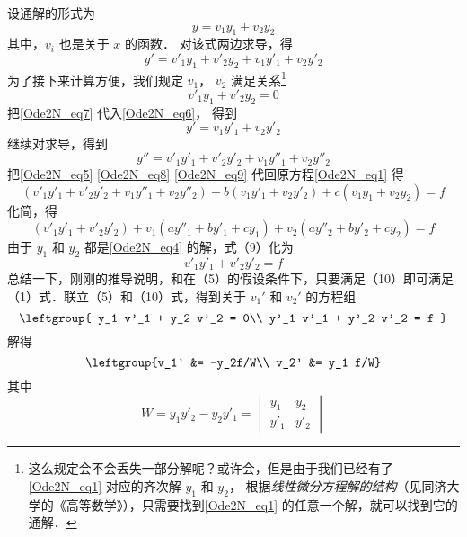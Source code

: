 设通解的形式为
\begin{equation}\label{Ode2N_eq5}
y = v_1 y_1 + v_2 y_2
\end{equation}
其中，$v_i$ 也是关于 $x$ 的函数． 对该式两边求导，得
\begin{equation}\label{Ode2N_eq6}
y' = v'_1 y_1 + v'_2 y_2 + v_1 y'_1 + v_2 y'_2
\end{equation}
为了接下来计算方便，我们规定 $v_1$， $v_2$ 满足关系\footnote{这么规定会不会丢失一部分解呢？或许会，但是由于我们已经有了\autoref{Ode2N_eq1} 对应的齐次解 $y_1$ 和 $y_2$， 根据\emph{线性微分方程解的结构}（见同济大学的《高等数学》），只需要找到\autoref{Ode2N_eq1} 的任意一个解，就可以找到它的通解．}
\begin{equation}\label{Ode2N_eq7}
v'_1 y_1 + v'_2 y_2 = 0
\end{equation}
把\autoref{Ode2N_eq7} 代入\autoref{Ode2N_eq6}， 得到
\begin{equation}\label{Ode2N_eq8}
y' = v_1 y'_1 + v_2 y'_2
\end{equation}
继续对求导，得到
\begin{equation}\label{Ode2N_eq9}
y'' = v'_1 y'_1 + v'_2 y'_2 + v_1 y''_1 + v_2 y''_2
\end{equation}
把\autoref{Ode2N_eq5} \autoref{Ode2N_eq8} \autoref{Ode2N_eq9} 代回原方程\autoref{Ode2N_eq1} 得
\begin{equation}
(v'_1 y'_1 + v'_2 y'_2 + v_1 y''_1 + v_2 y''_2) + b (v_1 y'_1 + v_2 y'_2) + c(v_1 y_1 + v_2 y_2) = f
\end{equation}
化简，得
\begin{equation}
(v'_1 y'_1 + v'_2 y'_2) + v_1 (a y''_1 + b y'_1 + c y_1) + v_2 (a y''_2 + b y'_2 + c y_2) = f \end{equation}
由于 $y_1$ 和 $y_2$ 都是\autoref{Ode2N_eq4} 的解，式（9）化为 %
\begin{equation} v'_1 y'_1 + v'_2 y'_2 = f
\end{equation}
总结一下，刚刚的推导说明，和在（5）的假设条件下，只要满足（10）即可满足（1）式．联立（5）和（10）式，得到关于 $v_1'$ 和 $v_2'$ 的方程组
\begin{equation}
\leftgroup{
y_1 v'_1 + y_2 v'_2 = 0\\
y'_1 v'_1 + y'_2 v'_2 = f
}\end{equation}
解得
\begin{equation}
\leftgroup{v_1' &= -y_2f/W\\
v_2' &= y_1 f/W}
\end{equation}
其中
\begin{equation}
W = y_1 y'_2 - y_2 y'_1 = 
\begin{vmatrix}
y_1 & y_2\\
y'_1 & y'_2
\end{vmatrix}
\end{equation}
